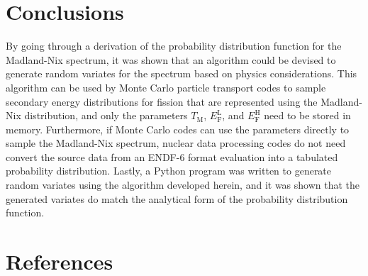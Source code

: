 \documentclass[3p,fleqn]{elsarticle}
\newcommand{\tmax}{T_{\mathrm{M}}}
\newcommand{\efl}{E_{\mathrm{F}}^{\mathrm{L}}}
\newcommand{\efh}{E_{\mathrm{F}}^{\mathrm{H}}}
\begin{document}
\section{Conclusions}

By going through a derivation of the probability distribution function for the
Madland-Nix spectrum, it was shown that an algorithm could be devised to
generate random variates for the spectrum based on physics considerations. This
algorithm can be used by Monte Carlo particle transport codes to sample
secondary energy distributions for fission that are represented using the
Madland-Nix distribution, and only the parameters $\tmax$, $\efl$, and $\efh$
need to be stored in memory. Furthermore, if Monte Carlo codes can use the
parameters directly to sample the Madland-Nix spectrum, nuclear data processing
codes do not need convert the source data from an ENDF-6 format evaluation into
a tabulated probability distribution. Lastly, a Python program was written to
generate random variates using the algorithm developed herein, and it was shown
that the generated variates do match the analytical form of the probability
distribution function.

\section*{References}



\end{document}
